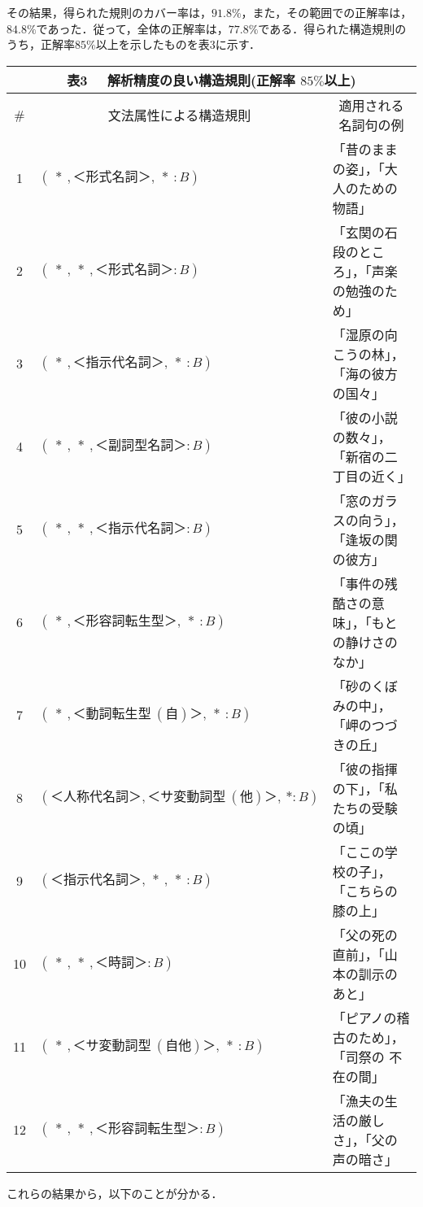 その結果，得られた規則のカバー率は，$91.8\%$，また，その範囲での正解率は，
$84.8\%$であった．従って，全体の正解率は，$77.8\%$である．得られた構造規則の
うち，正解率$85\%$以上を示したものを表3に示す．

 \begin{center}
   \setlength{\tabcolsep}{3pt}
   \small
    \begin{tabular}{|c|l|l|}
    \multicolumn{3}{c}{{\small {\bf 表3} \ \ 解析精度の良い構造規則(正解率
     $85\%$以上)}}
     \\ \hline
    \#&\multicolumn{1}{c|}{文法属性による構造規則}&\multicolumn{1}{c|}{適用される名詞句の例} \\ \hline
    1&$(\ * \ ,＜形式名詞＞,\ * \ :B)$&「昔のままの姿」，「大人のための物語」\\ \hline
    2&$(\ * \ ,\ * \ ,＜形式名詞＞:B)$&「玄関の石段のところ」，「声楽の勉強のため」\\
     \hline
    3&$(\ * \ ,＜指示代名詞＞,\ * \ :B)$&「湿原の向こうの林」，「海の彼方の国々」\\
     \hline
    4&$(\ * \ ,\ * \ ,＜副詞型名詞＞:B)$&「彼の小説の数々」，「新宿の二丁目の近く」\\
     \hline
    5&$(\ * \ ,\ * \ ,＜指示代名詞＞:B)$&「窓のガラスの向う」，「逢坂の関の彼方」\\
     \hline
    6&$(\ * \ ,＜形容詞転生型＞,\ * \ :B)$&「事件の残酷さの意味」，「もとの静けさの
     なか」\\ \hline
    7&$(\ * \ ,＜動詞転生型 \ (自)＞,\ * \ :B)$&「砂のくぼみの中」，「岬のつづきの丘」
     \\ \hline
    8&$(＜人称代名詞＞,＜サ変動詞型 \ (他)＞,\ *:B)$&「彼の指揮の下」，「私
     たちの受験の頃」\\ \hline
    9&$(＜指示代名詞＞,\ * \ ,\ * \ :B)$&「ここの学校の子」，「こちらの膝の上」\\
     \hline
    10&$(\ * \ ,\ * \ ,＜時詞＞:B)$&「父の死の直前」，「山本の訓示のあと」\\ \hline
    11&$(\ * \ ,＜サ変動詞型 \ (自他)＞,\ * \ :B)$&「ピアノの稽古のため」，「司祭の
     不在の間」\\ \hline
     12&$(\ * \ ,\ * \ ,＜形容詞転生型＞:B)$&「漁夫の生活の厳しさ」，「父の声の暗さ」
     \\ \hline
\end{tabular}
\end{center}

これらの結果から，以下のことが分かる．\vspace{\baselineskip}

